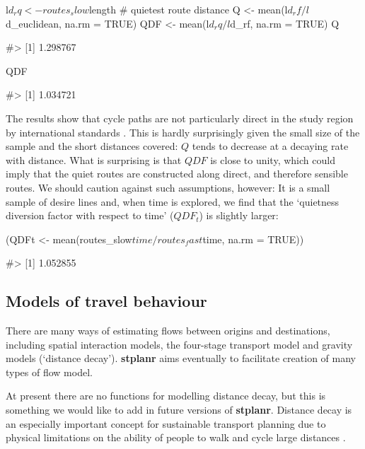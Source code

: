 \begin{Schunk}
\begin{Sinput}
l$d_rq <- routes_slow$length # quietest route distance
Q <- mean(l$d_rf / l$d_euclidean, na.rm = TRUE)
QDF <- mean(l$d_rq / l$d_rf, na.rm = TRUE)
Q
\end{Sinput}
\begin{Soutput}
#> [1] 1.298767
\end{Soutput}
\begin{Sinput}
QDF
\end{Sinput}
\begin{Soutput}
#> [1] 1.034721
\end{Soutput}
\end{Schunk}

The results show that cycle paths are not particularly direct in the
study region by international standards \citep{crow_design_2007}. This
is hardly surprisingly given the small size of the sample and the short
distances covered: \(Q\) tends to decrease at a decaying rate with
distance. What is surprising is that \(QDF\) is close to unity, which
could imply that the quiet routes are constructed along direct, and
therefore sensible routes. We should caution against such assumptions,
however: It is a small sample of desire lines and, when time is
explored, we find that the `quietness diversion factor with respect to
time' (\(QDF_t\)) is slightly larger:

\begin{Schunk}
\begin{Sinput}
(QDFt <- mean(routes_slow$time / routes_fast$time, na.rm = TRUE))
\end{Sinput}
\begin{Soutput}
#> [1] 1.052855
\end{Soutput}
\end{Schunk}

\subsection{Models of travel
behaviour}\label{models-of-travel-behaviour}

There are many ways of estimating flows between origins and
destinations, including spatial interaction models, the four-stage
transport model and gravity models (`distance decay'). \textbf{stplanr}
aims eventually to facilitate creation of many types of flow model.

At present there are no functions for modelling distance decay, but this
is something we would like to add in future versions of
\textbf{stplanr}. Distance decay is an especially important concept for
sustainable transport planning due to physical limitations on the
ability of people to walk and cycle large distances
\citep{iacono_measuring_2010}.


